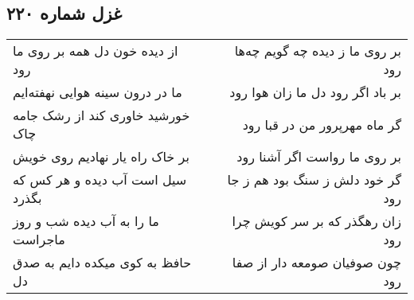 \begin{center}
\section*{غزل شماره ۲۲۰}
\label{sec:sh220}
\begin{longtable}{l p{0.5cm} r}
از دیده خون دل همه بر روی ما رود
&&
بر روی ما ز دیده چه گویم چه‌ها رود
\\
ما در درون سینه هوایی نهفته‌ایم
&&
بر باد اگر رود دل ما زان هوا رود
\\
خورشید خاوری کند از رشک جامه چاک
&&
گر ماه مهرپرور من در قبا رود
\\
بر خاک راه یار نهادیم روی خویش
&&
بر روی ما رواست اگر آشنا رود
\\
سیل است آب دیده و هر کس که بگذرد
&&
گر خود دلش ز سنگ بود هم ز جا رود
\\
ما را به آب دیده شب و روز ماجراست
&&
زان رهگذر که بر سر کویش چرا رود
\\
حافظ به کوی میکده دایم به صدق دل
&&
چون صوفیان صومعه دار از صفا رود
\\
\end{longtable}
\end{center}
